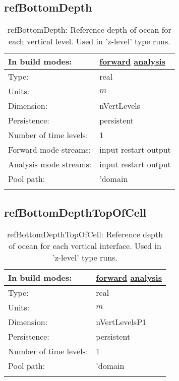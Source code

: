 \subsection[refBottomDepth]{refBottomDepth}
\label{subsec:var_sec_mesh_refBottomDepth}
\begin{center}
\begin{longtable}{| p{2.0in} | p{4.0in} |}
        \hline 
        In build modes: & \hyperref[subsec:forward_var_tab_mesh]{forward} \hyperref[subsec:analysis_var_tab_mesh]{analysis} \\
        \hline 
        Type: & real \\
        \hline 
        Units: & $m$ \\
        \hline 
        Dimension: & nVertLevels \\
        \hline 
        Persistence: & persistent \\
        \hline 
        Number of time levels: & 1 \\
        \hline 
		 Forward mode streams: &  input restart output \\
        \hline 
		 Analysis mode streams: &  input restart output \\
        \hline 
            Pool path: & 'domain %
 \\
		 \hline 
    \caption{refBottomDepth: Reference depth of ocean for each vertical level. Used in 'z-level' type runs.}
\end{longtable}
\end{center}
\subsection[refBottomDepthTopOfCell]{refBottomDepthTopOfCell}
\label{subsec:var_sec_mesh_refBottomDepthTopOfCell}
\begin{center}
\begin{longtable}{| p{2.0in} | p{4.0in} |}
        \hline 
        In build modes: & \hyperref[subsec:forward_var_tab_mesh]{forward} \hyperref[subsec:analysis_var_tab_mesh]{analysis} \\
        \hline 
        Type: & real \\
        \hline 
        Units: & $m$ \\
        \hline 
        Dimension: & nVertLevelsP1 \\
        \hline 
        Persistence: & persistent \\
        \hline 
        Number of time levels: & 1 \\
        \hline 
            Pool path: & 'domain %
 \\
		 \hline 
    \caption{refBottomDepthTopOfCell: Reference depth of ocean for each vertical interface. Used in 'z-level' type runs.}
\end{longtable}
\end{center}
